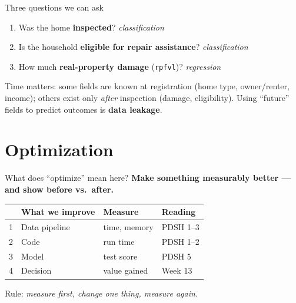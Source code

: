 \documentclass[aspectratio=43,11pt]{beamer}
\begin{document}
\begin{frame}{Three questions we can ask}
  \begin{enumerate}
    \item Was the home \textbf{inspected}? \hfill \emph{classification}
    \item Is the household \textbf{eligible for repair assistance}? \hfill \emph{classification}
    \item How much \textbf{real-property damage} (\texttt{rpfvl})? \hfill \emph{regression}
  \end{enumerate}
  \vspace{1em}
  \alert{Time matters:} some fields are known at registration
  (home type, owner/renter, income); others exist only \emph{after} inspection
  (damage, eligibility). Using ``future'' fields to predict outcomes is
  \textbf{data leakage}.
\end{frame}

\section{Optimization}

\begin{frame}{What does ``optimize'' mean here?}
  \textbf{Make something measurably better --- and show before vs.\ after.}
  \vspace{1em}
  \begin{center}
  \begin{tabular}{@{}llll@{}}
    \toprule
    & What we improve & Measure & Reading \\
    \midrule
    1 & Data pipeline & time, memory & PDSH 1--3 \\
    2 & Code          & run time     & PDSH 1--2 \\
    3 & Model         & test score   & PDSH 5 \\
    4 & Decision      & value gained & Week 13 \\
    \bottomrule
  \end{tabular}
  \end{center}
  \vspace{1em}
  Rule: \emph{measure first, change one thing, measure again.}
\end{frame}
\end{document}
